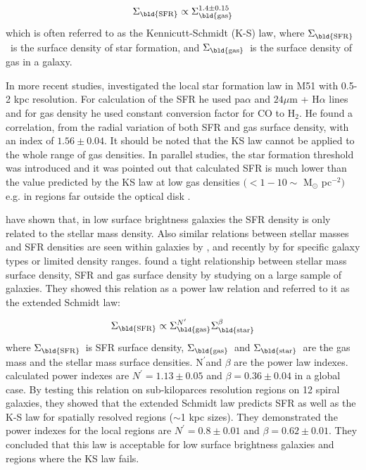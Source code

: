 \documentclass[useAMS,usenatbib]{mn2e}
\newcommand \sigmagas    {$\Sigma_{\rm \bld {gas }}$\ }
\newcommand \eqsigmagas    {\Sigma_{\rm \bld {gas }}}
\newcommand \sigmasfr     {$\Sigma_{\rm \bld {SFR }}$\ }
\newcommand \eqsigmasfr     {\Sigma_{\rm \bld {SFR }}}
\newcommand \sigmastar    {$\Sigma_{\rm \bld {star }}$\ }
\newcommand \eqsigmastar    {\Sigma_{\rm \bld {star }}}
\newcommand \nprime {N$^\prime$}
\newcommand \eqnprime {N^\prime}
\begin{document}
\begin{equation}
\label{equ:ks_org}
\eqsigmasfr \propto \eqsigmagas^{1.4\pm0.15}
\end{equation}
which is often referred to as the Kennicutt-Schmidt (K-S) law, where \sigmasfr is the surface density of star formation, and \sigmagas is the surface density of gas in a galaxy.


In more recent studies, \cite{Kennicutt08} investigated the local star formation law in M51 with 0.5-2 kpc resolution. For calculation of the SFR he used pa${\alpha}$ and $24\mu$m + H${\alpha}$ lines and for gas density he used constant conversion factor for CO to H$_2$. He found a correlation, from the radial variation of both SFR and gas surface density, with an index of $1.56 \pm 0.04$.
It should be noted that the KS law cannot be applied to the whole range of gas densities. In parallel studies, the star formation threshold was introduced and it was pointed out that calculated SFR is much lower than the value predicted by the KS law at low gas densities $( < 1-10\sim$ M$_{\odot}$ pc$^{-2})$ e.g. in regions far outside the optical disk \citep[e.g.,][]{Martin01, Bigiel08}.

\cite{Hunter98} have shown that, in low surface brightness galaxies the SFR density is only related to the stellar mass density. Also similar relations between stellar masses and SFR densities are seen within galaxies by \cite{Ryder94}, \cite{Hunter04} and recently by \cite{Leroy08} for specific galaxy types or limited density ranges. \cite{Shi11} found a tight relationship between stellar mass surface density, SFR and gas surface density by studying on a large sample of galaxies. They showed this relation as a power law relation and referred to it as the extended Schmidt law:

\begin{equation}
\label{equ:es_org}
\eqsigmasfr \propto \eqsigmagas^{\eqnprime} \eqsigmastar^{\beta}
\end{equation}
where \sigmasfr is SFR surface density, \sigmagas and \sigmastar are the gas mass and the stellar mass surface densities. \nprime and $\beta$ are the power law indexes. \cite{Shi11} calculated power indexes are $\eqnprime = 1.13 \pm 0.05$ and $\beta = 0.36\pm0.04$ in a global case. By testing this relation on sub-kiloparces resolution regions on 12 spiral galaxies, they showed that the extended Schmidt law predicts SFR as well as the K-S law for spatially resolved regions ($\sim$1 kpc sizes). They demonstrated the power indexes for the local regions are $\eqnprime = 0.8 \pm 0.01$ and $\beta = 0.62\pm0.01$. They concluded that this law is acceptable for low surface brightness galaxies and regions where the KS law fails.
\end{document}
